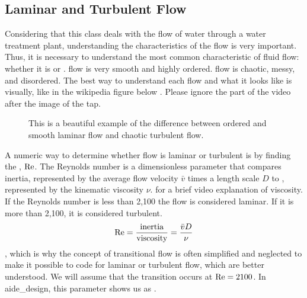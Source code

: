 \documentclass[letterpaper,10pt,english]{sphinxmanual}
\let\sphinxpxdimen\pdfpxdimen\else\newdimen\sphinxpxdimen
\begin{document}
\subsection{Laminar and Turbulent Flow}
\label{\detokenize{Review/Review_Fluid_Mechanics:laminar-and-turbulent-flow}}\label{\detokenize{Review/Review_Fluid_Mechanics:heading-laminar-and-turbulent-flow}}
Considering that this class deals with the flow of water through a water treatment plant, understanding the characteristics of the flow is very important. Thus, it is necessary to understand the most common characteristic of fluid flow: whether it is  or .  flow is very smooth and highly ordered.  flow is chaotic, messy, and disordered. The best way to understand each flow and what it looks like is visually, like in the wikipedia figure below . Please ignore the part of the video after the image of the tap.

\begin{figure}[htbp]
\centering
\capstart

\noindent\sphinxincludegraphics[width=400\sphinxpxdimen]{{Wikipedia_laminar_turbulent}.png}
\caption{This is a beautiful example of the difference between ordered and smooth laminar flow and chaotic turbulent flow.}\label{\detokenize{Review/Review_Fluid_Mechanics:id2}}\label{\detokenize{Review/Review_Fluid_Mechanics:figure-wikipedia-laminar-turbulent}}\end{figure}

A numeric way to determine whether flow is laminar or turbulent is by finding the , \({\rm Re}\). The Reynolds number is a dimensionless parameter that compares inertia, represented by the average flow velocity \(\bar v\) times a length scale \(D\) to , represented by the kinematic viscosity \(\nu\).  for a brief video explanation of viscosity. If the Reynolds number is less than 2,100 the flow is considered laminar. If it is more than 2,100, it is considered turbulent.
\begin{equation}\label{equation:Review/Review_Fluid_Mechanics:Review/Review_Fluid_Mechanics:3}
\begin{split}{\rm Re = \frac{inertia}{viscosity}} = \frac{\bar vD}{\nu}\end{split}
\end{equation}
, which is why the concept of transitional flow is often simplified and neglected to make it possible to code for laminar or turbulent flow, which are better understood. We will assume that the transition occurs at \(\rm{Re} = 2100\). In aide\_design, this parameter shows us as .
\end{document}
